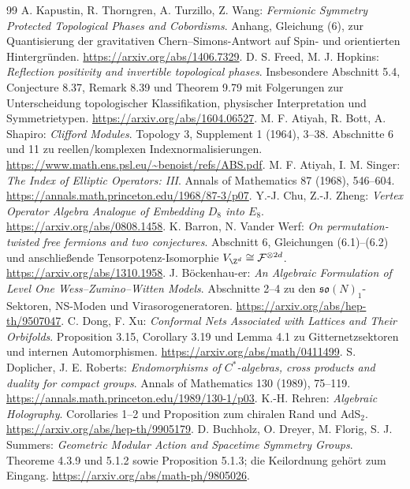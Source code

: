 \begin{thebibliography}{99}
 A. Kapustin, R. Thorngren, A. Turzillo, Z. Wang: \emph{Fermionic Symmetry Protected Topological Phases and Cobordisms}. Anhang, Gleichung (6), zur Quantisierung der gravitativen Chern--Simons-Antwort auf Spin- und orientierten Hintergründen. \url{https://arxiv.org/abs/1406.7329}.
 D. S. Freed, M. J. Hopkins: \emph{Reflection positivity and invertible topological phases}. Insbesondere Abschnitt 5.4, Conjecture 8.37, Remark 8.39 und Theorem 9.79 mit Folgerungen zur Unterscheidung topologischer Klassifikation, physischer Interpretation und Symmetrietypen. \url{https://arxiv.org/abs/1604.06527}.
 M. F. Atiyah, R. Bott, A. Shapiro: \emph{Clifford Modules}. Topology 3, Supplement 1 (1964), 3--38. Abschnitte 6 und 11 zu reellen/komplexen Indexnormalisierungen. \url{https://www.math.ens.psl.eu/~benoist/refs/ABS.pdf}.
 M. F. Atiyah, I. M. Singer: \emph{The Index of Elliptic Operators: III}. Annals of Mathematics 87 (1968), 546--604. \url{https://annals.math.princeton.edu/1968/87-3/p07}.
 Y.-J. Chu, Z.-J. Zheng: \emph{Vertex Operator Algebra Analogue of Embedding $D_8$ into $E_8$}. \url{https://arxiv.org/abs/0808.1458}.
 K. Barron, N. Vander Werf: \emph{On permutation-twisted free fermions and two conjectures}. Abschnitt 6, Gleichungen (6.1)--(6.2) und anschließende Tensorpotenz-Isomorphie $V_{\Z^d}\cong\mathcal F^{\otimes2d}$. \url{https://arxiv.org/abs/1310.1958}.
 J. B\"ockenhau-er: \emph{An Algebraic Formulation of Level One Wess--Zumino--Witten Models}. Abschnitte 2--4 zu den $\mathfrak{so}(N)_1$-Sektoren, NS-Moden und Virasorogeneratoren. \url{https://arxiv.org/abs/hep-th/9507047}.
 C. Dong, F. Xu: \emph{Conformal Nets Associated with Lattices and Their Orbifolds}. Proposition 3.15, Corollary 3.19 und Lemma 4.1 zu Gitternetzsektoren und internen Automorphismen. \url{https://arxiv.org/abs/math/0411499}.
 S. Doplicher, J. E. Roberts: \emph{Endomorphisms of $C^*$-algebras, cross products and duality for compact groups}. Annals of Mathematics 130 (1989), 75--119. \url{https://annals.math.princeton.edu/1989/130-1/p03}.
 K.-H. Rehren: \emph{Algebraic Holography}. Corollaries 1--2 und Proposition zum chiralen Rand und AdS$_2$. \url{https://arxiv.org/abs/hep-th/9905179}.
 D. Buchholz, O. Dreyer, M. Florig, S. J. Summers: \emph{Geometric Modular Action and Spacetime Symmetry Groups}. Theoreme 4.3.9 und 5.1.2 sowie Proposition 5.1.3; die Keilordnung gehört zum Eingang. \url{https://arxiv.org/abs/math-ph/9805026}.

\end{thebibliography}
